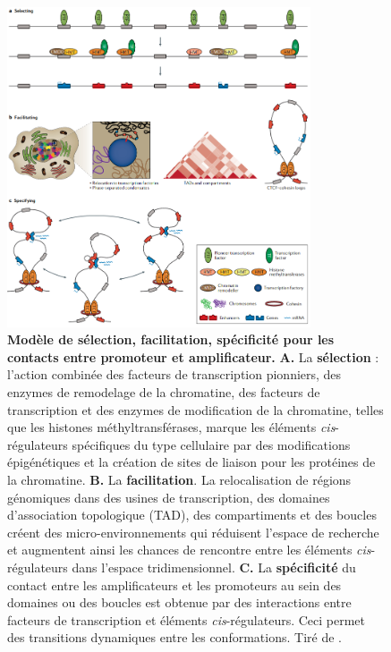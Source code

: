 \begin{figure}[hbt!]
 \centering
 \includegraphics[width=0.8\textwidth, page=1] {figures/introduction/fig14.png}
 \caption[Modèle de sélection, facilitation, spécificité pour les contacts entre promoteur et amplificateur.]{
 \textbf{Modèle de sélection, facilitation, spécificité pour les contacts entre promoteur et amplificateur.}
 \textbf{A.} La \textbf{sélection} : l'action combinée des facteurs de transcription pionniers, des enzymes de remodelage de la chromatine, des facteurs de transcription et des enzymes de modification de la chromatine, telles que les histones méthyltransférases, marque les éléments \textit{cis}-régulateurs spécifiques du type cellulaire par des modifications épigénétiques et la création de sites de liaison pour les protéines de la chromatine. \textbf{B.} La \textbf{facilitation}. La relocalisation de régions génomiques dans des usines de transcription, des domaines d'association topologique (TAD), des compartiments et des boucles créent des micro-environnements qui réduisent l'espace de recherche et augmentent ainsi les chances de rencontre entre les éléments \textit{cis}-régulateurs dans l'espace tridimensionnel. \textbf{C.} La \textbf{spécificité} du contact entre les \glspl{amplificateur} et les promoteurs au sein des domaines ou des boucles est obtenue par des interactions entre facteurs de transcription et éléments \textit{cis}-régulateurs. Ceci permet des transitions dynamiques entre les conformations.
 Tiré de \citet{schoenfelder_long-range_2019}.\\
 }
 \label{fig:Fig14}
\end{figure}


